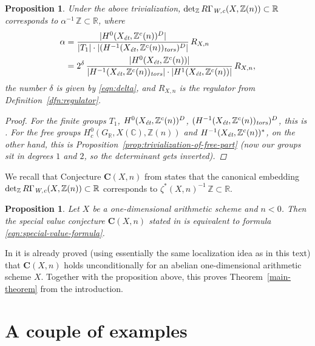 \documentclass[draft]{article}
\newcommand{\CC}{\mathbb{C}}
\newcommand{\RR}{\mathbb{R}}
\newcommand{\ZZ}{\mathbb{Z}}
\renewcommand{\det}{\operatorname{det}}
\newcommand{\et}{\text{\it \'{e}t}}
\newcommand{\tors}{\text{\it tors}}
\newcommand{\Wc}{\text{\it W,c}}
\theoremstyle{myplain}
\newtheorem{proposition}[theorem]{Proposition}
\theoremstyle{mydefinition}
\begin{document}
\begin{proposition}
  Under the above trivialization, $\det_\ZZ R\Gamma_\Wc (X, \ZZ(n)) \subset \RR$
  corresponds to $\alpha^{-1}\,\ZZ \subset \RR$, where
  \begin{align*}
    \alpha & = \frac{|H^0 (X_\et, \ZZ^c(n))^D|}{|T_1| \cdot |(H^{-1} (X_\et, \ZZ^c(n))_\tors)^D|}\,R_{X,n} \\
           & = 2^\delta\,\frac{|H^0 (X_\et, \ZZ^c (n))|}{|H^{-1} (X_\et, \ZZ^c(n))_\tors|\cdot |H^1 (X_\et, \ZZ^c(n))|}\,R_{X,n},
  \end{align*}
  the number $\delta$ is given by \eqref{eqn:delta}, and $R_{X,n}$ is
  the regulator from Definition~\ref{dfn:regulator}.

  \begin{proof}
    For the finite groups $T_1$, $H^0 (X_\et, \ZZ^c(n))^D$,
    $(H^{-1} (X_\et, \ZZ^c(n))_\tors)^D$, this is
    \cite[Lemma~A.5]{Beshenov-Weil-etale-2}. For the free groups
    $H^0_c (G_\RR, X(\CC), \ZZ(n))$ and $H^{-1} (X_\et, \ZZ^c (n))^*$, on the
    other hand, this is Proposition~\ref{prop:trivialization-of-free-part}
    (now our groups sit in degrees $1$ and $2$, so the determinant gets
    inverted).
  \end{proof}
\end{proposition}

We recall that Conjecture $\mathbf{C} (X,n)$ from
\cite[\S 4]{Beshenov-Weil-etale-2} states that the canonical embedding
$\det_\ZZ R\Gamma_\Wc (X, \ZZ(n)) \subset \RR$ corresponds to
$\zeta^* (X,n)^{-1}\,\ZZ \subset \RR$.

\begin{proposition}
  Let $X$ be a one-dimensional arithmetic scheme and ${n < 0}$. Then the special
  value conjecture $\mathbf{C} (X,n)$ stated in \cite{Beshenov-Weil-etale-2} is
  equivalent to formula \eqref{eqn:special-value-formula}.
\end{proposition}

In \cite[\S 7]{Beshenov-Weil-etale-2} it is already proved (using essentially
the same localization idea as in this text) that $\mathbf{C} (X,n)$ holds
unconditionally for an abelian one-dimensional arithmetic scheme $X$. Together
with the proposition above, this proves Theorem~\ref{main-theorem} from the
introduction.


\section{A couple of examples}
\label{sec:examples}
\end{document}
